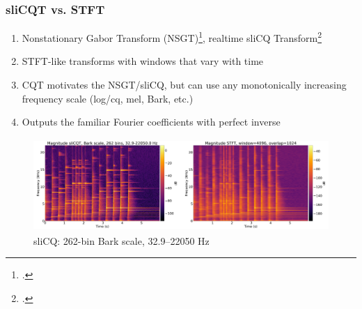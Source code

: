 \documentclass[usenames,dvipsnames]{beamer}
\begin{document}
\begin{frame}
	\frametitle{sliCQT vs. STFT}
	\begin{enumerate}
	\item
		Nonstationary Gabor Transform (NSGT)\footcite{balazs}, realtime sliCQ Transform\footcite{invertiblecqt, slicq, variableq1}
	\item
		STFT-like transforms with windows that vary with time
	\item
		CQT motivates the NSGT/sliCQ, but can use any monotonically increasing frequency scale (log/cq, mel, Bark, etc.)
	\item
		Outputs the familiar Fourier coefficients with perfect inverse
	\end{enumerate}
	\begin{figure}[ht]
		\centering
		\vspace{-0.5em}
		\includegraphics[height=3.5cm]{./images/slicq_spectral.png}
		\vspace{-0.5em}
		\caption{sliCQ: 262-bin Bark scale, 32.9--22050 Hz}
		\vspace{-0.5em}
	\end{figure}
\end{frame}
\end{document}
